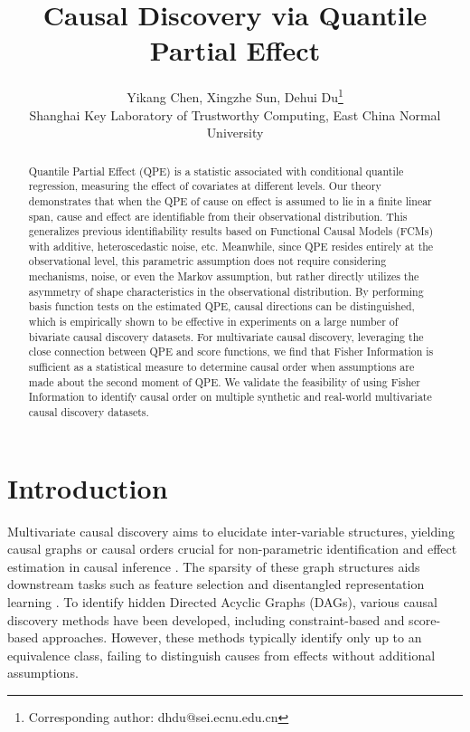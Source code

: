 \documentclass{article}
\title{Causal Discovery via Quantile Partial Effect}
\author{Yikang Chen, Xingzhe Sun, Dehui Du\thanks{Corresponding author: dhdu@sei.ecnu.edu.cn}\\
Shanghai Key Laboratory of Trustworthy Computing, East China Normal University
}
\theoremstyle{plain}
\theoremstyle{definition}
\theoremstyle{remark}
\begin{document}
\maketitle

\begin{abstract}
Quantile Partial Effect (QPE) is a statistic associated with conditional quantile regression, measuring the effect of covariates at different levels. Our theory demonstrates that when the QPE of cause on effect is assumed to lie in a finite linear span, cause and effect are identifiable from their observational distribution. This generalizes previous identifiability results based on Functional Causal Models (FCMs) with additive, heteroscedastic noise, etc. Meanwhile, since QPE resides entirely at the observational level, this parametric assumption does not require considering mechanisms, noise, or even the Markov assumption, but rather directly utilizes the asymmetry of shape characteristics in the observational distribution. By performing basis function tests on the estimated QPE, causal directions can be distinguished, which is empirically shown to be effective in experiments on a large number of bivariate causal discovery datasets. For multivariate causal discovery, leveraging the close connection between QPE and score functions, we find that Fisher Information is sufficient as a statistical measure to determine causal order when assumptions are made about the second moment of QPE. We validate the feasibility of using Fisher Information to identify causal order on multiple synthetic and real-world multivariate causal discovery datasets.
\end{abstract}%
\section{Introduction}

Multivariate causal discovery aims to elucidate inter-variable structures, yielding causal graphs or causal orders crucial for non-parametric identification and effect estimation in causal inference \citep{Pearl2009}. The sparsity of these graph structures aids downstream tasks such as feature selection \citep{Guyon2007} and disentangled representation learning \citep{Yang2021}. To identify hidden Directed Acyclic Graphs (DAGs), various causal discovery methods have been developed, including constraint-based \citep{Spirtes1991, Spirtes1995} and score-based \citep{Cooper1992, Chickering2002} approaches. However, these methods typically identify only up to an equivalence class, failing to distinguish causes from effects without additional assumptions.
\end{document}
